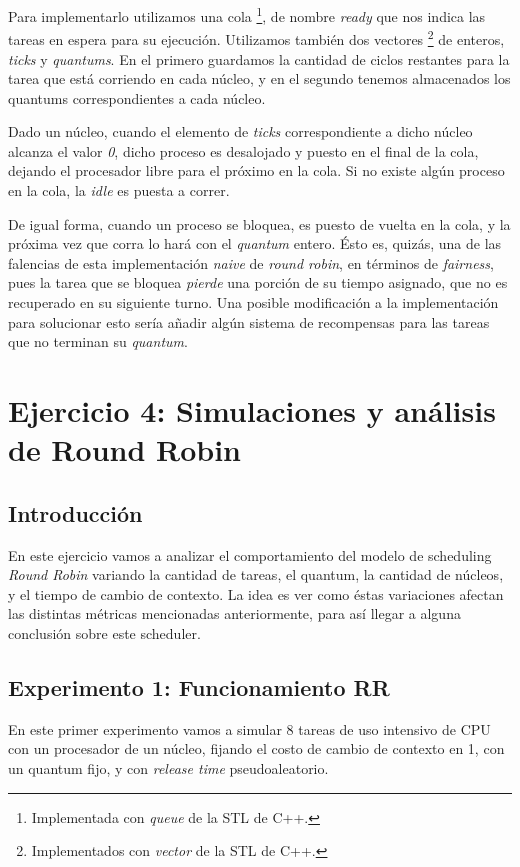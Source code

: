 \documentclass[a4paper]{article}
\begin{document}
Para implementarlo utilizamos una cola \footnote{Implementada con
\textit{queue} de la STL de C++.}, de nombre
\textit{ready} que nos indica las tareas en espera para su ejecución.
Utilizamos también dos vectores \footnote{Implementados con
\textit{vector} de la STL de C++.} de enteros, \textit{ticks} y
\textit{quantums}. En el primero guardamos la cantidad de ciclos restantes
para la tarea que está corriendo en cada núcleo, y en el segundo tenemos
almacenados los quantums correspondientes a cada núcleo. 

Dado un núcleo, cuando el elemento de \textit{ticks} correspondiente a dicho
núcleo alcanza el valor \textit{0}, dicho proceso es desalojado y puesto en
el final de la cola, dejando el procesador libre para el próximo en la cola.
Si no existe algún proceso en la cola, la \textit{idle} es puesta a correr.

De igual forma, cuando un proceso se bloquea, es puesto de vuelta en la
cola, y la próxima vez que corra lo hará con el \textit{quantum} entero.
Ésto es, quizás, una de las falencias de esta implementación \textit{naive}
de \textit{round robin}, en términos de \textit{fairness}, pues la tarea que
se bloquea \textit{pierde} una porción de su tiempo asignado, que no es
recuperado en su siguiente turno. Una posible modificación a la
implementación para solucionar esto sería añadir algún sistema de
recompensas para las tareas que no terminan su \textit{quantum}.

\section{Ejercicio 4: Simulaciones y análisis de Round Robin}

\subsection{Introducción}
En este ejercicio vamos a analizar el comportamiento del modelo de
scheduling \textit{Round Robin} variando la cantidad de tareas, el quantum,
la cantidad de núcleos, y el tiempo de cambio de contexto.
La idea es ver como éstas variaciones afectan las distintas métricas
mencionadas anteriormente, para así llegar a alguna conclusión sobre este
scheduler.

\subsection{Experimento 1: Funcionamiento RR}
En este primer experimento vamos a simular 8 tareas de uso intensivo de CPU
con un procesador de un núcleo, fijando el costo de cambio de contexto en 1,
con un quantum fijo, y con \textit{release time} pseudoaleatorio.
\end{document}
